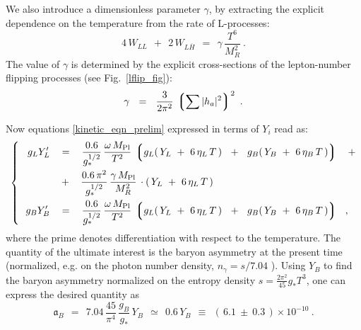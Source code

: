 \documentclass[12pt]{revtex4}
\newcommand{\lgr}{\left\lgroup}
\newcommand{\rgr}{\right\rgroup}
\newcommand{\Mpl}{M_{\rm Pl}}
\newcommand{\ov}{\overline}
\begin{document}
	We also introduce a dimensionless parameter $ \gamma $, 
	by extracting the explicit dependence on the temperature from
	the rate of L-processes:
\begin{equation*}
	4\, W_{LL} ~~+~~ 2\, W_{L\ov{H}} ~~=~~ 
		 \gamma\, \frac{T^6}{M_R^2}~.
\end{equation*}
	The value of $ \gamma $ is determined by the explicit 
	cross-sections of the lepton-number flipping processes
	(see Fig.~\ref{lflip_fig}):
\begin{equation}
\label{gamma}
	\gamma  ~~=~~ \frac{3}{2\pi^2}\, \lgr \sum |h_a|^2 \rgr^2~.
\end{equation}

	Now equations \eqref{kinetic_eqn_prelim} expressed in terms of
	$ Y_i $ read as:
\begin{equation}
\label{eqn_Y}
\left\{~~
\begin{split}
	g_L Y_L' 
	& ~~\;=~~\;
	\frac{0.6}{g_*^{1/2}}\, 
	\frac{\omega\,\Mpl}{T^2}\,
	\lgr g_L (\,Y_L~+~6\,\eta_L\,T\,) ~~+~~ 
	     g_B (\,Y_B~+~6\,\eta_B\,T\,)  \rgr 
	\;~~+
	\\
	& \;~~+~~\;  
	\frac{0.6\,\pi^2}{g_*^{1/2}}\, 
	\frac{\gamma\,\Mpl}{M_R^2}\,
	\cdot (\, Y_L ~+~ 6\,\eta_L\,T\,)\\
	g_B Y_B' 
	& ~~\;=~~\;
	\frac{0.6}{g_*^{1/2}}\, 
	\frac{\omega\,\Mpl}{T^2}\,
	\lgr g_L (\,Y_L~+~6\,\eta_L\,T\,) ~~+~~ 
	     g_B (\,Y_B~+~6\,\eta_B\,T\,)  \rgr 
	~~,
\end{split}
\right.
\end{equation}
	where the prime denotes differentiation with respect to
	the temperature.
	The quantity of the ultimate interest is the baryon asymmetry 
	at the present time (normalized, e.g. on the photon number density,
	$ n_\gamma = s / 7.04 $ \cite{Kolb:1990vq}). 
	Using $ Y_B $ to find the baryon asymmetry normalized on the entropy
	density $ s = \frac{2\pi^2}{45} g_* T^3 $, one can express the desired
	quantity as
\begin{equation}
\label{def_asy}
	\mathfrak{a}_B ~~=~~ 7.04\, \frac{45}{\pi^4}\, \frac{g_B}{g_*}\, Y_B
	~~\simeq~~ 0.6 \, Y_B 
		~~\equiv~~ (\, 6.1 ~\pm~ 0.3 \,)\times 10^{-10}~.
\end{equation}
\end{document}
